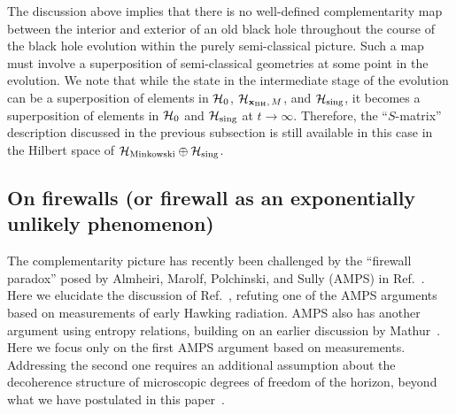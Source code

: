 \documentclass[12pt]{article}
\begin{document}
The discussion above implies that there is no well-defined complementarity 
map between the interior and exterior of an old black hole throughout the 
course of the black hole evolution within the purely semi-classical picture. 
Such a map must involve a superposition of semi-classical geometries at 
some point in the evolution.  We note that while the state in the intermediate 
stage of the evolution can be a superposition of elements in ${\cal H}_0$, 
${\cal H}_{{\bf x}_{\rm BH},\, M}$, and ${\cal H}_{\rm sing}$, it becomes 
a superposition of elements in ${\cal H}_0$ and ${\cal H}_{\rm sing}$ 
at $t \rightarrow \infty$.  Therefore, the ``$S$-matrix'' description 
discussed in the previous subsection is still available in this case in 
the Hilbert space of ${\cal H}_{\rm Minkowski} \oplus {\cal H}_{\rm sing}$.


\subsection{On firewalls (or firewall as an exponentially unlikely phenomenon)}
\label{subsec:firewall}

The complementarity picture has recently been challenged by the ``firewall 
paradox'' posed by Almheiri, Marolf, Polchinski, and Sully (AMPS) 
in Ref.~\cite{Almheiri:2012rt}.  Here we elucidate the discussion of 
Ref.~\cite{Nomura:2012sw}, refuting one of the AMPS arguments based 
on measurements of early Hawking radiation.  AMPS also has another 
argument using entropy relations, building on an earlier discussion by 
Mathur~\cite{Mathur:2009hf,Braunstein:2009my}.  Here we focus only on 
the first AMPS argument based on measurements.  Addressing the second 
one requires an additional assumption about the decoherence structure 
of microscopic degrees of freedom of the horizon, beyond what we have 
postulated in this paper~\cite{Nomura:2012ex}.
\end{document}

